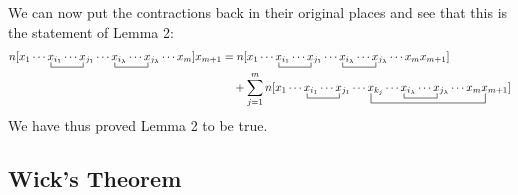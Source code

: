 \documentclass{article}
\newcommand{\ctr}{\bcontraction}
\newcommand{\cd}{\ensuremath{\cdots} }
\begin{document}
We can now put the contractions back in their original places and see that this is the statement of Lemma 2:
\begin{align*}
n[x_1 \cd \ctr{}{x}{{}_{i_1} \cd }{x}   x_{i_1} \cd  x_{j_1} \cd   \ctr{}{x}{{}_{i_\lambda} \cd }{x} x_{i_\lambda} \cd   x_{j_\lambda} \cd x_m]x_{m + 1} 
&= n[x_1 \cd \ctr{}{x}{{}_{i_1} \cd }{x} x_{i_1} \cd  x_{j_1} \cd   \ctr{}{x}{{}_{i_\lambda} \cd }{x} x_{i_\lambda} \cd   x_{j_\lambda} \cd x_m x_{m + 1} ] \\
&\quad + \sum_{j=1}^m  n[x_1 \cd \ctr{}{x}{{}_{i_1} \cd }{x} x_{i_1} \cd  x_{j_1} \cd \ctr[2ex]{}{x}{{}_{k_j} \cd  \ctr{}{x}{{}_{i_\lambda} \cd }{x} x_{i_\lambda} \cd   x_{j_\lambda} \cd x_m }{x}   x_{k_j} \cd  
\ctr{}{x}{{}_{i_\lambda} \cd }{x} x_{i_\lambda} \cd   x_{j_\lambda} \cd x_m x_{m + 1} ]
\end{align*}
We have thus proved Lemma 2 to be true. 

\subsection{Wick's Theorem}
\end{document}
